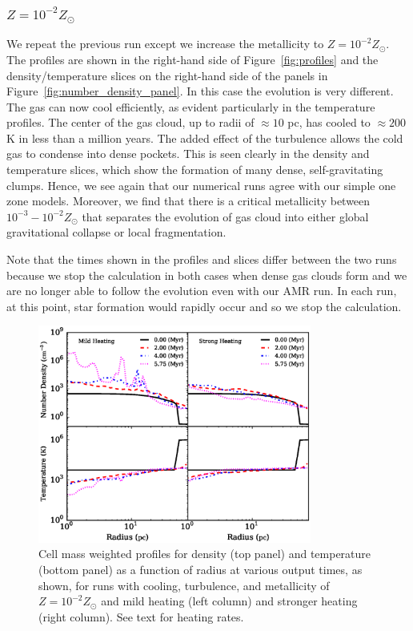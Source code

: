 \documentclass[useAMS,usenatbib]{mn2e}
\begin{document}

\subsubsection{$Z=10^{-2}Z_\odot$}

We repeat the previous run except we increase the metallicity to $Z=10^{-2}Z_\odot$.  The profiles are shown
in the right-hand side of Figure~\ref{fig:profiles} and the density/temperature slices on the right-hand side of the panels in Figure~\ref{fig:number_density_panel}.  In this case the evolution is very different.
The gas can now cool efficiently, as evident particularly in the temperature profiles.   The center
of the gas cloud, up to radii of $\approx 10$ pc, has cooled to $\approx 200$ K in less than a million years. The added effect of the turbulence
allows the cold gas to condense into dense pockets.  This is seen clearly in the density and temperature slices, which show the formation of many dense, self-gravitating clumps.  
Hence, we see again that our numerical runs agree with our simple one zone models. Moreover, we find that there is a critical metallicity
between $10^{-3}-10^{-2}Z_\odot$ that separates the evolution of gas cloud into either global gravitational collapse or local fragmentation. 

Note that the times shown in the profiles and slices differ between the two runs because we stop the calculation in both cases when dense gas clouds form and we are no longer able to follow the evolution even with our AMR run.  In each run, at this point, star formation would rapidly occur and so we stop the calculation.

\begin{figure}
\begin{center}
\includegraphics[width=9.0cm]{Images/profile_heating}
\end{center}
\caption{\label{fig:profiles_heating} Cell mass weighted profiles for 
density (top panel) and temperature (bottom panel) as a function of radius at various 
output times, as shown, for runs with cooling, turbulence, and metallicity of $Z=10^{-2}Z_\odot$
and mild heating (left column) and stronger heating (right column).  See text for heating rates.}
\end{figure}
\end{document}

